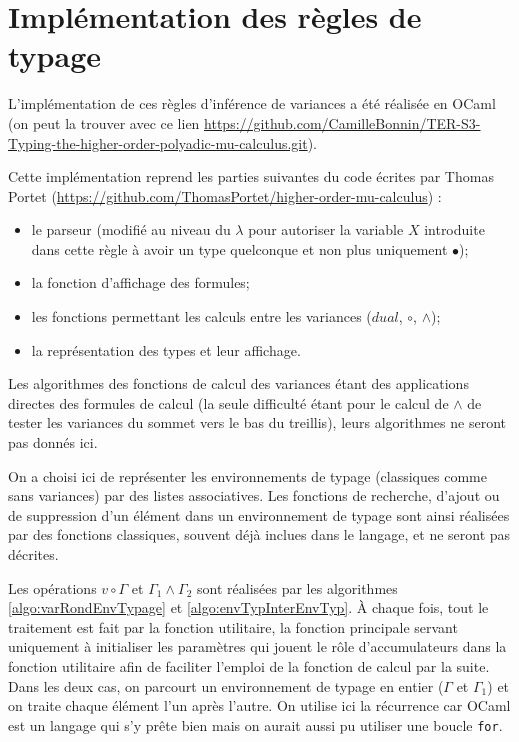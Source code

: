 \documentclass{rapport}
\theoremstyle{plain}
\theoremstyle{remark}
\theoremstyle{definition}
\begin{document}
\section{Implémentation des règles de typage\label{algos}}

L'implémentation de ces règles d'inférence de variances a été réalisée en OCaml (on peut la trouver avec ce lien \url{https://github.com/CamilleBonnin/TER-S3-Typing-the-higher-order-polyadic-mu-calculus.git}). 

Cette implémentation reprend les parties suivantes du code écrites par Thomas Portet (\url{https://github.com/ThomasPortet/higher-order-mu-calculus}) :
\begin{itemize}
	\item le parseur (modifié au niveau du $\lambda$ pour autoriser la variable $X$ introduite dans cette règle à avoir un type quelconque et non plus uniquement $\bullet$);
	\item la fonction d'affichage des formules;
	\item les fonctions permettant les calculs entre les variances ($dual$, $\circ$, $\wedge$);
	\item la représentation des types et leur affichage.
\end{itemize} 

Les algorithmes des fonctions de calcul des variances étant des applications directes des formules de calcul (la seule difficulté étant pour le calcul de $\wedge$ de tester les variances du sommet vers le bas du treillis), leurs algorithmes ne seront pas donnés ici. 

On a choisi ici de représenter les environnements de typage (classiques comme sans variances) par des listes associatives. Les fonctions de recherche, d'ajout ou de suppression d'un élément dans un environnement de typage sont ainsi réalisées par des fonctions classiques, souvent déjà inclues dans le langage, et ne seront pas décrites. 

Les opérations $v \circ \Gamma$ et $\Gamma_1 \wedge \Gamma_2$ sont réalisées par les algorithmes \ref{algo:varRondEnvTypage} et \ref{algo:envTypInterEnvTyp}. À chaque fois, tout le traitement est fait par la fonction utilitaire, la fonction principale servant uniquement à initialiser les paramètres qui jouent le rôle d'accumulateurs dans la fonction utilitaire afin de faciliter l'emploi de la fonction de calcul par la suite. Dans les deux cas, on parcourt un environnement de typage en entier ($\Gamma$ et $\Gamma_1$) et on traite chaque élément l'un après l'autre. On utilise ici la récurrence car OCaml est un langage qui s'y prête bien mais on aurait aussi pu utiliser une boucle \texttt{for}.
\end{document}
